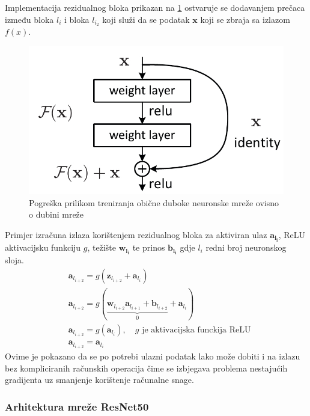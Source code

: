 \documentclass[times, utf8, zavrsni,numeric,pstricks]{fer}
\newcommand{\vect}[1]{\boldsymbol{#1}}
\begin{document}
Implementacija rezidualnog bloka prikazan na \ref{fig:residual_block} ostvaruje se dodavanjem prečaca  između bloka $l_i$ i bloka $l_{i_2}$ koji služi da se podatak $\vect{x}$ koji se zbraja sa izlazom $f(x)$. 

\begin{figure}[H]
	\centering
	\includegraphics[width=\linewidth, height=0.3\paperheight,keepaspectratio]{resnet_block.jpeg}
	\caption{Pogreška prilikom treniranja obične duboke neuronske mreže ovisno o dubini mreže  \cite{residual}}
	\label{fig:residual_block}
\end{figure}


\noindent
Primjer izračuna izlaza korištenjem rezidualnog bloka za aktiviran ulaz $\vect{a_{l_i}}$, ReLU aktivacijsku funkciju $g$, težište $\vect{w_{l_i}}$ te prinos $\vect{b_{l_i}}$ gdje $l_i$ redni broj neuronskog sloja.
\begin{align*}
	& \vect{a}_{l_{i+2}}  = g(\vect{z}_{l_{i+2}} + \vect{a}_{l_i}) \\
	& \vect{a}_{l_{i+2}}  = g(\underbrace{\vect{w}_{l_{i+2}} \vect{a}_{l_{i+1}} + \vect{b}_{l_{i+2}}}_{0} + \vect{a}_{l_i}) \\
	& \vect{a}_{l_{i+2}}  = g(\vect{a}_{l_i}),\quad\text{$g$ je aktivacijska funckija ReLU}\\
	& \vect{a}_{l_{i+2}}  = \vect{a}_{l_i}
\end{align*}
\noindent
Ovime je pokazano da se po potrebi ulazni podatak lako može dobiti i na izlazu bez kompliciranih računskih operacija čime se izbjegava problema nestajućih gradijenta uz smanjenje korištenje računalne snage.

\subsubsection{Arhitektura mreže ResNet50}
\end{document}
